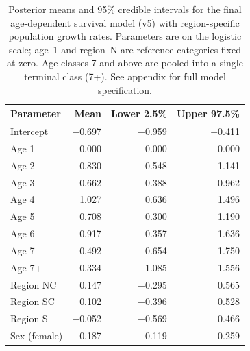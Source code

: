 \documentclass[12pt,a4paper,final,abstract=true,headings=small]{scrartcl}
\begin{document}
\begin{table}[!htbp]
  \centering
  \captionsetup{font=scriptsize}
  \caption{Posterior means and 95\% credible intervals for the final
    age-dependent survival model (v5) with region-specific population
    growth rates. Parameters are on the logistic scale; age~1 and
    region~N are reference categories fixed at zero. Age classes 7 and
    above are pooled into a single terminal class (7+). See appendix
    for full model specification.}
  \label{table:param}
  \scriptsize
  \begin{tabular}{lrrr}
    \toprule
    Parameter    & Mean     & Lower 2.5\% & Upper 97.5\% \\
    \midrule
    Intercept    & $-$0.697 & $-$0.959    & $-$0.411     \\
    \midrule
    Age 1        & 0.000    & 0.000       & 0.000        \\
    Age 2        & 0.830    & 0.548       & 1.141        \\
    Age 3        & 0.662    & 0.388       & 0.962        \\
    Age 4        & 1.027    & 0.636       & 1.496        \\
    Age 5        & 0.708    & 0.300       & 1.190        \\
    Age 6        & 0.917    & 0.357       & 1.636        \\
    Age 7        & 0.492    & $-$0.654    & 1.750        \\
    Age 7+       & 0.334    & $-$1.085    & 1.556        \\
    \midrule
    Region NC    & 0.147    & $-$0.295    & 0.565        \\
    Region SC    & 0.102    & $-$0.396    & 0.528        \\
    Region S     & $-$0.052 & $-$0.569    & 0.466        \\
    \midrule
    Sex (female) & 0.187    & 0.119       & 0.259        \\
    \bottomrule
  \end{tabular}
\end{table}
\end{document}
